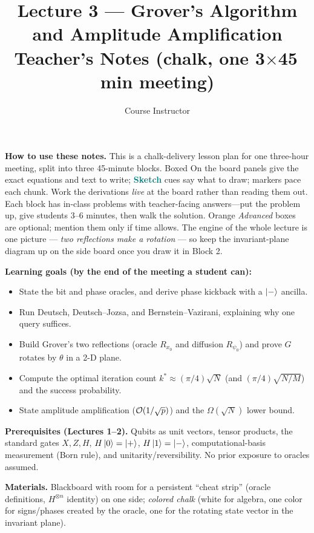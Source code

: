 \documentclass[11pt]{article}
\title{\textbf{Lecture 3 --- Grover's Algorithm and Amplitude Amplification}\\[0.3em]\large Teacher's Notes (chalk, one 3$\times$45\,min meeting)}
\author{Course Instructor}
\date{}
\begin{document}
\maketitle

\noindent\textbf{How to use these notes.} This is a chalk-delivery lesson plan for
one three-hour meeting, split into three 45-minute blocks. Boxed \textsf{On the
board} panels give the exact equations and text to write; \textcolor{teal}{\textbf{Sketch}}
cues say what to draw;  markers pace each chunk. Work the derivations
\emph{live} at the board rather than reading them out. Each block has in-class
problems with teacher-facing answers---put the problem up, give students 3--6
minutes, then walk the solution. Orange \emph{Advanced} boxes are optional; mention
them only if time allows. The engine of the whole lecture is one picture ---
\emph{two reflections make a rotation} --- so keep the invariant-plane diagram up on
the side board once you draw it in Block 2.

\medskip
\noindent\textbf{Learning goals (by the end of the meeting a student can):}
\begin{itemize}[leftmargin=1.4em,nosep]
  \item State the bit and phase oracles, and derive phase kickback with a $\ket{-}$ ancilla.
  \item Run Deutsch, Deutsch--Jozsa, and Bernstein--Vazirani, explaining why one query suffices.
  \item Build Grover's two reflections (oracle $R_{x_0}$ and diffusion $R_{\psi_0}$) and prove $G$ rotates by $\theta$ in a 2-D plane.
  \item Compute the optimal iteration count $k^{\ast}\approx(\pi/4)\sqrt{N}$ (and $(\pi/4)\sqrt{N/M}$) and the success probability.
  \item State amplitude amplification ($\mathcal{O}(1/\sqrt p)$) and the $\Omega(\sqrt N)$ lower bound.
\end{itemize}

\medskip
\noindent\textbf{Prerequisites (Lectures 1--2).} Qubits as unit vectors, tensor
products, the standard gates $X,Z,H$, $H\ket0=\ket{+}$, $H\ket1=\ket{-}$,
computational-basis measurement (Born rule), and unitarity/reversibility. No prior
exposure to oracles assumed.

\medskip
\noindent\textbf{Materials.} Blackboard with room for a persistent ``cheat strip''
(oracle definitions, $H^{\otimes n}$ identity) on one side; \emph{colored chalk}
(white for algebra, one color for signs/phases created by the oracle, one for the
rotating state vector in the invariant plane).
\end{document}
